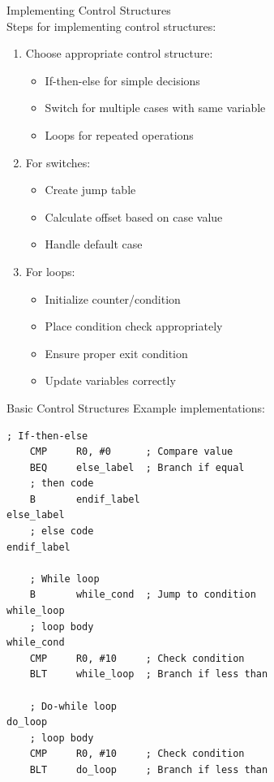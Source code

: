 \begin{KR}{Implementing Control Structures}\\
Steps for implementing control structures:
\begin{enumerate}
  \item Choose appropriate control structure:
    \begin{itemize}
      \item If-then-else for simple decisions
      \item Switch for multiple cases with same variable
      \item Loops for repeated operations
    \end{itemize}
  \item For switches:
    \begin{itemize}
      \item Create jump table
      \item Calculate offset based on case value
      \item Handle default case
    \end{itemize}
  \item For loops:
    \begin{itemize}
      \item Initialize counter/condition
      \item Place condition check appropriately
      \item Ensure proper exit condition
      \item Update variables correctly
    \end{itemize}
\end{enumerate}
\end{KR}

\begin{example2}{Basic Control Structures}
Example implementations:
\begin{lstlisting}[language=armasm, style=basesmol]
    ; If-then-else
    CMP     R0, #0      ; Compare value
    BEQ     else_label  ; Branch if equal
    ; then code
    B       endif_label
else_label
    ; else code
endif_label

    ; While loop
    B       while_cond  ; Jump to condition
while_loop
    ; loop body
while_cond
    CMP     R0, #10     ; Check condition
    BLT     while_loop  ; Branch if less than

    ; Do-while loop
do_loop
    ; loop body
    CMP     R0, #10     ; Check condition
    BLT     do_loop     ; Branch if less than
\end{lstlisting}
\end{example2}